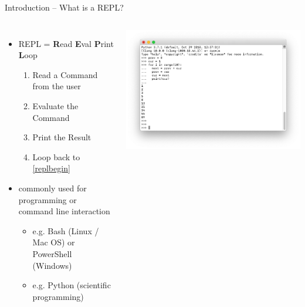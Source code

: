 \documentclass{beamer}
\begin{document}
    \begin{frame}{Introduction -- What is a REPL?}
        \begin{columns}
            \begin{itemize}
                \item REPL = \textbf{R}ead \textbf{E}val \textbf{P}rint \textbf{L}oop
                \begin{enumerate}
                    \item\label{replbegin} Read a Command from the user
                    \item Evaluate the Command
                    \item Print the Result
                    \item Loop back to \ref{replbegin}
                \end{enumerate}
                \item commonly used for programming or command line interaction
                \begin{itemize}
                    \item e.g. Bash (Linux / Mac OS) or PowerShell (Windows)
                    \item e.g. Python (scientific programming)
                \end{itemize}
            \end{itemize}
            \includegraphics[scale=0.25]{images/repl}
        \end{columns}
    \end{frame}
\end{document}
